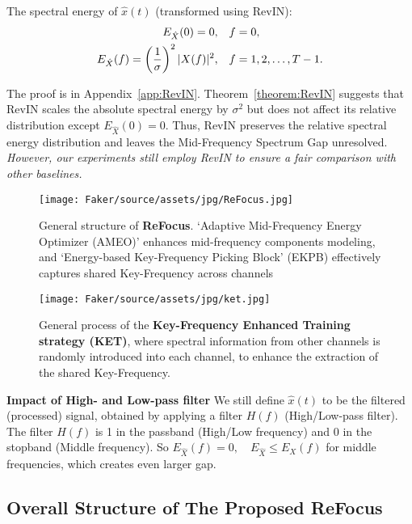 \begin{theorem}  \label{theorem:RevIN}
\vspace{-0.2cm}
The spectral energy of $\hat{x}(t)$ (transformed using RevIN):
\begin{align}
E_{\hat{X}}(0)=0,& \quad f=0, \notag\\
E_{\hat{X}}(f) = \left( \frac{1}{\sigma} \right)^2 |X(f)|^2,&\quad f = 1,2,\dots, T-1 . 
\end{align}
\vspace{-0.2cm}
\end{theorem}
The proof is in Appendix~\ref{app:RevIN}. Theorem~\ref{theorem:RevIN} suggests that RevIN scales the absolute spectral energy by $ \sigma^2 $ but does not affect its relative distribution except $E_{\hat{X}}(0)=0$. Thus, RevIN preserves the relative spectral energy distribution and leaves the Mid-Frequency Spectrum Gap unresolved. \textit{However, our experiments still employ RevIN to ensure a fair comparison with other baselines.}
\begin{figure*}[h]
  \centering
  \texttt{[image: Faker/source/assets/jpg/ReFocus.jpg]}
  \caption{General structure of \textbf{ReFocus}. `Adaptive Mid-Frequency Energy Optimizer (AMEO)' enhances mid-frequency components modeling, and `Energy-based Key-Frequency Picking Block' (EKPB) effectively captures shared Key-Frequency across channels}
  \label{fig:refocus}
\end{figure*}

\begin{figure*}[h]
  \centering
  \texttt{[image: Faker/source/assets/jpg/ket.jpg]}
  \caption{General process of the \textbf{Key-Frequency Enhanced Training strategy (KET)}, where spectral information from other channels is randomly introduced into each channel, to enhance the extraction of the shared Key-Frequency.}
  \label{fig:reshuffle}
\end{figure*}
\textbf{Impact of High- and Low-pass filter \quad}
We still define $\hat{x}(t)$ to be the filtered (processed) signal, obtained by applying a filter $H(f)$ (High/Low-pass filter). The filter $ H(f) $ is 1 in the passband (High/Low frequency) and 0 in the stopband (Middle frequency). So $E_{\hat{X}}(f)=0,\quad E_{\hat{X}}\leq E_X(f)$ for middle frequencies, which creates even larger gap.

\subsection{Overall Structure of The Proposed ReFocus}


